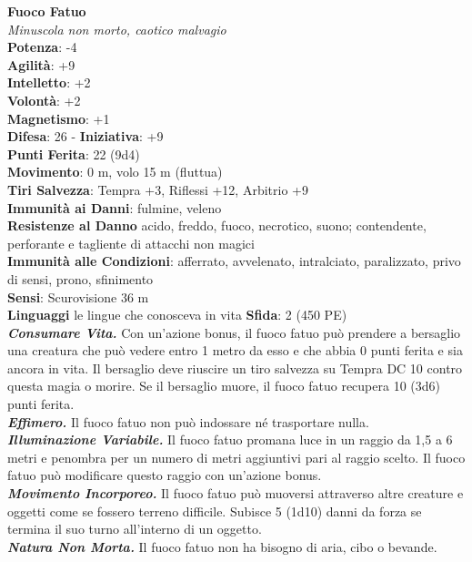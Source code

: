 \begin{multicols}{2}
\medskip\textbf{Fuoco Fatuo}\\
\emph{Minuscola non morto, caotico malvagio}\\
\textbf{Potenza}: -4\\
\textbf{Agilità}: +9\\
\textbf{Intelletto}: +2\\
\textbf{Volontà}: +2\\
\textbf{Magnetismo}: +1\\
\textbf{Difesa}: 26 - \textbf{Iniziativa}: +9\\
\textbf{Punti Ferita}: 22 (9d4)\\
\textbf{Movimento}: 0 m, volo 15 m (fluttua)\\
\textbf{Tiri Salvezza}: Tempra +3, Riflessi +12, Arbitrio +9\\
\textbf{Immunità ai Danni}: fulmine, veleno\\
\textbf{Resistenze al Danno} acido, freddo, fuoco, necrotico, suono; contendente, perforante e tagliente di attacchi non magici\\
\textbf{Immunità alle Condizioni}: afferrato, avvelenato, intralciato, paralizzato, privo di sensi, prono, sfinimento\\
\textbf{Sensi}: Scurovisione 36 m\\
\textbf{Linguaggi} le lingue che conosceva in vita
\textbf{Sfida}: 2 (450 PE)\smallskip\\
\emph{\textbf{Consumare Vita.}} Con un'azione bonus, il fuoco fatuo può prendere a bersaglio una creatura che può vedere entro 1 metro da esso e che abbia 0 punti ferita e sia ancora in vita. Il bersaglio deve riuscire un tiro salvezza su Tempra DC 10 contro questa magia o morire. Se il bersaglio muore, il fuoco fatuo recupera 10 (3d6) punti ferita.\\
\emph{\textbf{Effimero.}} Il fuoco fatuo non può indossare né trasportare nulla.\\
\emph{\textbf{Illuminazione Variabile.}} Il fuoco fatuo promana luce in un raggio da 1,5 a 6 metri e penombra per un numero di metri aggiuntivi pari al raggio scelto. Il fuoco fatuo può modificare questo raggio con un'azione bonus.\\
\emph{\textbf{Movimento Incorporeo.}} Il fuoco fatuo può muoversi attraverso altre creature e oggetti come se fossero terreno difficile. Subisce 5 (1d10) danni da forza se termina il suo turno all'interno di un oggetto.\\
\emph{\textbf{Natura Non Morta.}} Il fuoco fatuo non ha bisogno di aria, cibo o bevande.\\

\end{multicols}

